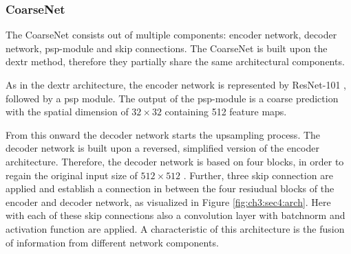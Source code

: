 \subsubsection{CoarseNet}
The CoarseNet consists out of multiple components: encoder network, decoder network, \gls{psp}-module and skip connections. The CoarseNet is built upon the \gls{dextr} method, therefore they partially share the same architectural components.

As in the \gls{dextr} architecture, the encoder network is represented by ResNet-101 \cite{He16-ResNet}, followed by a \gls{psp} module.
The output of the \gls{psp}-module is a coarse prediction with the spatial dimension of  $32 \times 32$  containing 512 feature maps. 

From this onward the decoder network starts the upsampling process.
The decoder network is built upon a reversed, simplified version of the encoder architecture. %
Therefore, the decoder network is based on four blocks, in order to regain the original input size of  $512 \times 512$ .
Further, three skip connection are applied and establish a connection in between the four resiudual blocks of the encoder and decoder network, as visualized in Figure \ref{fig:ch3:sec4:arch}.
Here with each of these skip connections also a convolution layer with batchnorm \cite{SS15-Batchnorm} and activation function are applied.
A characteristic of this architecture is the fusion of information from different network components.


